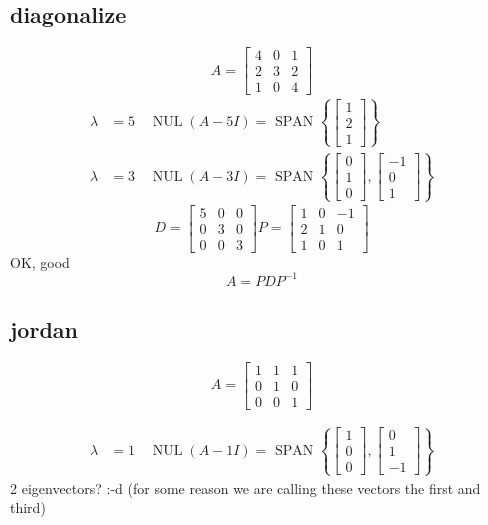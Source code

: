 \documentclass[a4paper]{article}
\begin{document}
\subsection*{diagonalize}
\label{sec-5-1}
$$
A=\left[\begin{array}{lll}{4} & {0} & {1} \\ {2} & {3} & {2} \\ {1} & {0} & {4}\end{array}\right]
$$
\begin{align*}
\lambda&=5 \quad \operatorname{NUL}(A-5 I) =\text { SPAN }\left\{\left[\begin{array}{l}{1} \\ {2} \\ {1}\end{array}\right]\right\} \\
\lambda&=3 \quad \operatorname{NUL}(A-3 I) = \text { SPAN }\left\{\left[\begin{array}{l}{0} \\ {1} \\ {0}\end{array}\right],\left[\begin{array}{c}{-1} \\ {0} \\ {1}\end{array}\right]\right\}
\end{align*}
$$
D=\left[\begin{array}{lll}{5} & {0} & {0} \\ {0} & {3} & {0} \\ {0} & {0} & {3}\end{array}\right]
P=\left[\begin{array}{llc}{1} & {0} & {-1} \\ {2} & {1} & {0} \\ {1} & {0} & {1}\end{array}\right]
$$
OK, good
$$
A=P D P^{-1}
$$
\subsection*{jordan}
\label{sec-5-2}
$$
A=\left[\begin{array}{lll}{1} & {1} & {1} \\ {0} & {1} & {0} \\ {0} & {0} & {1}\end{array}\right]
$$

\begin{align*}
\lambda&=1 \quad \operatorname{NUL}(A-1 I) = \text { SPAN }\left\{\left[\begin{array}{l}{1} \\ {0} \\ {0}\end{array}\right],\left[\begin{array}{c}{0} \\ {1} \\ {-1}\end{array}\right]\right\}
\end{align*}
2 eigenvectors? :-d    (for some reason we are calling these vectors the first and third)
\end{document}
